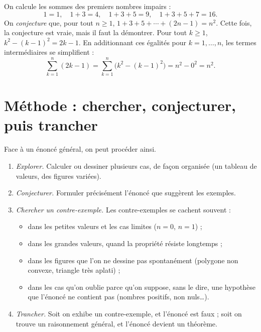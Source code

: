 \documentclass[11pt]{article}
\begin{document}
\begin{exemple}
On calcule les sommes des premiers nombres impairs :
\[
1 = 1, \quad 1 + 3 = 4, \quad 1 + 3 + 5 = 9, \quad 1 + 3 + 5 + 7 = 16 .
\]
On \emph{conjecture} que, pour tout $n \geqslant 1$,
$1 + 3 + 5 + \cdots + (2n - 1) = n^2$. Cette fois, la conjecture est vraie,
mais il faut la démontrer. Pour tout $k \geqslant 1$,
$k^2 - (k-1)^2 = 2k - 1$. En additionnant ces égalités pour
$k = 1, \ldots, n$, les termes intermédiaires se simplifient :
\[
\sum_{k=1}^{n} (2k - 1) = \sum_{k=1}^{n} \bigl(k^2 - (k-1)^2\bigr) = n^2 - 0^2 = n^2 .
\]
\end{exemple}

\section{Méthode : chercher, conjecturer, puis trancher}\label{sec:methode}

Face à un énoncé général, on peut procéder ainsi.
\begin{enumerate}
  \item \emph{Explorer.} Calculer ou dessiner plusieurs cas, de façon
  organisée (un tableau de valeurs, des figures variées).
  \item \emph{Conjecturer.} Formuler précisément l'énoncé que suggèrent les
  exemples.
  \item \emph{Chercher un contre-exemple.} Les contre-exemples se cachent
  souvent :
  \begin{itemize}
    \item dans les petites valeurs et les cas limites ($n = 0$, $n = 1$) ;
    \item dans les grandes valeurs, quand la propriété résiste longtemps ;
    \item dans les figures que l'on ne dessine pas spontanément (polygone
    non convexe, triangle très aplati) ;
    \item dans les cas qu'on oublie parce qu'on suppose, sans le dire, une
    hypothèse que l'énoncé ne contient pas (nombres positifs, non nuls\ldots).
  \end{itemize}
  \item \emph{Trancher.} Soit on exhibe un contre-exemple, et l'énoncé est
  faux ; soit on trouve un raisonnement général, et l'énoncé devient un
  théorème.
\end{enumerate}

\end{document}
